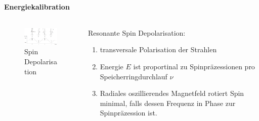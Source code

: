 \begin{iframe}
	\framesubtitle{Energiekalibration}
	\begin{columns}
		\begin{column}{0.48\textwidth}
	\begin{figure}
		\includegraphics[width=5.8cm]{img/spinrot}
		\caption*{Spin Depolarisation\cite{Arnaudon1995}}
	\end{figure}
\end{column}
		\begin{column}{0.50\textwidth}
			Resonante Spin Depolarisation:
			\begin{enumerate}
				\item transversale Polarisation der Strahlen
				\item Energie $E$ ist proportinal zu Spinpräzessionen pro Speicherringdurchlauf $\nu$
				\item Radiales oszillierendes Magnetfeld rotiert Spin minimal, falls dessen Frequenz in Phase zur Spinpräzession ist.
			\end{enumerate}
\end{column}
\end{columns}
\end{iframe}

